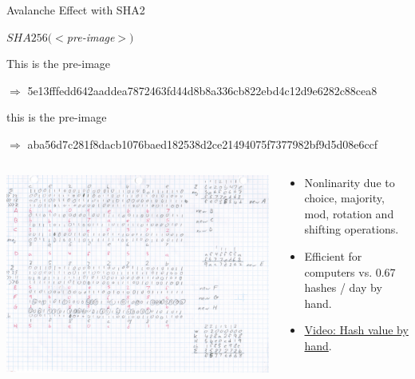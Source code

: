 \documentclass[handout]{beamer}
\begin{document}
\begin{frame}{Avalanche Effect with SHA2}

\begin{center}
$SHA256(<$\textit{pre-image}$>)$
\end{center}

This is the pre-image

$\Rightarrow$ \footnotesize 5e13fffedd642aaddea7872463fd44d8b8a336cb822ebd4c12d9e6282c88cea8 \normalsize
\vspace{1em}

\color{focus}t\color{black}his is the pre-image

$\Rightarrow$ \footnotesize \color{focus}aba56d7c281f8d\color{black}a\color{focus}cb1076baed182538d2ce21494075f7377982bf9d5d0\color{black}8\color{focus}e6ccf\color{black} \normalsize
\vspace{1em}

\begin{columns}[T]
	\begin{column}{0.35\textwidth}
		\includegraphics[width = 4 cm, frame]{../assets/images/manual_hashing_video.png}
	\end{column} %
	\begin{column}{0.65\textwidth}
		\begin{itemize}
			\item Nonlinarity due to choice, majority, mod, rotation and shifting operations.
			\item Efficient for computers vs. 0.67 hashes / day by hand.
			\item \link \href{https://www.youtube.com/watch?v=y3dqhixzGVo}{Video: Hash value by hand}.
		\end{itemize}
	\end{column}
\end{columns}

	
\end{frame}
\end{document}
